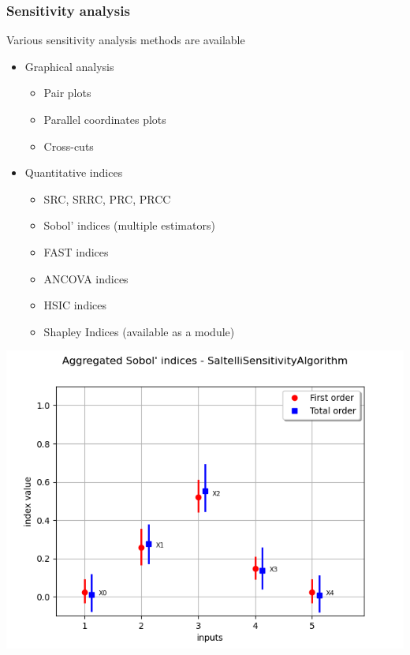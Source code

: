 \documentclass[aspectratio=169]{beamer}
\begin{document}



\begin{frame}
\frametitle{Sensitivity analysis}

\begin{minipage}[c]{0.6\textwidth}


Various sensitivity analysis methods are available
\begin{itemize}
\item Graphical analysis
\begin{itemize}
\item Pair plots
\item Parallel coordinates plots
\item Cross-cuts
\end{itemize}
\vspace{15pt}
\item Quantitative indices 
\begin{itemize}
\item SRC, SRRC, PRC, PRCC
\item Sobol' indices (multiple estimators)
\item FAST indices
\item ANCOVA indices
\item HSIC indices
\item Shapley Indices (available as a module)

\end{itemize}
\end{itemize}

\end{minipage}%
\begin{minipage}[c]{0.45\textwidth}
\includegraphics[width=1.\textwidth]{figures/SobolEx.png}
\end{minipage}

\end{frame}
\end{document}
